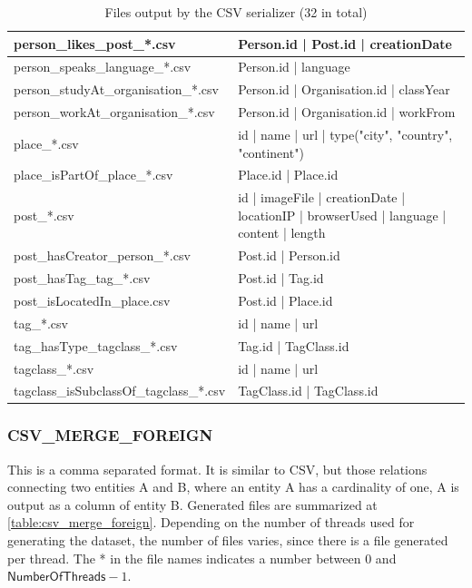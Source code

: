 \begin{table}[htbp]
\begin{tabular}{|p{4.6cm}|p{9.8cm}|}
        person\_likes\_post\_*.csv & Person.id | Post.id | creationDate \\
        \hline
        person\_speaks\_language\_*.csv & Person.id | language \\
        \hline
        person\_studyAt\_organisation\_*.csv & Person.id | Organisation.id | classYear \\
        \hline
        person\_workAt\_organisation\_*.csv &  Person.id | Organisation.id | workFrom \\
        \hline
        place\_*.csv & id | name | url | type({"city", "country", "continent"}) \\
        \hline
        place\_isPartOf\_place\_*.csv & Place.id | Place.id \\
        \hline
        post\_*.csv & id | imageFile | creationDate | locationIP | browserUsed | language | content | length \\
        \hline
        post\_hasCreator\_person\_*.csv & Post.id | Person.id \\
        \hline
        post\_hasTag\_tag\_*.csv & Post.id | Tag.id \\
        \hline
        post\_isLocatedIn\_place.csv & Post.id | Place.id \\
        \hline
        tag\_*.csv & id | name | url \\
        \hline
        tag\_hasType\_tagclass\_*.csv & Tag.id | TagClass.id \\
        \hline
        tagclass\_*.csv & id | name | url \\
        \hline
        tagclass\_isSubclassOf\_tagclass\_*.csv & TagClass.id | TagClass.id \\
        \hline
    \end{tabular}
    \caption{Files output by the CSV serializer (32 in total)}
    \label{table:csv}
\end{table}




\subsubsection{CSV\_MERGE\_FOREIGN}

This is a comma separated format. It is similar to CSV, but those relations
connecting two entities A and B, where an entity A has a cardinality of one, A
is output as a column of entity B. Generated files are summarized at
\autoref{table:csv_merge_foreign}. Depending on the number of threads used for generating
the dataset, the number of files varies, since there is a file generated per
thread. The * in the file names indicates a number between 0 and $\mathsf{NumberOfThreads}-1$.


